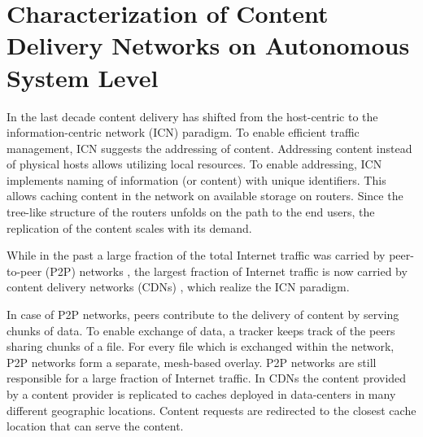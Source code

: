 \chapter{Characterization of Content Delivery Networks on Autonomous System Level}\label{chap:aslevel}

In the last decade content delivery has shifted from the host-centric to the information-centric network (ICN) paradigm.
To enable efficient traffic management, ICN suggests the addressing of content.
Addressing content instead of physical hosts allows utilizing local resources.
To enable addressing, ICN implements naming of information (or content) with unique identifiers.
This allows caching content in the network on available storage on routers.
Since the tree-like structure of the routers unfolds on the path to the end users, the replication of the content scales with its demand.

While in the past a large fraction of the total Internet traffic was carried by peer-to-peer (P2P) networks \cite{Cisc09}, the largest fraction of Internet traffic is now carried by content delivery networks (CDNs) \cite{cisco2016}, which realize the ICN paradigm.

In case of P2P networks, peers contribute to the delivery of content by serving chunks of data.
To enable exchange of data, a tracker keeps track of the peers sharing chunks of a file.
For every file which is exchanged within the network, P2P networks form a separate, mesh-based overlay.
P2P networks are still responsible for a large fraction of Internet traffic.
In CDNs the content provided by a content provider is replicated to caches deployed in data-centers in many different geographic locations.
Content requests are redirected to the closest cache location that can serve the content.

